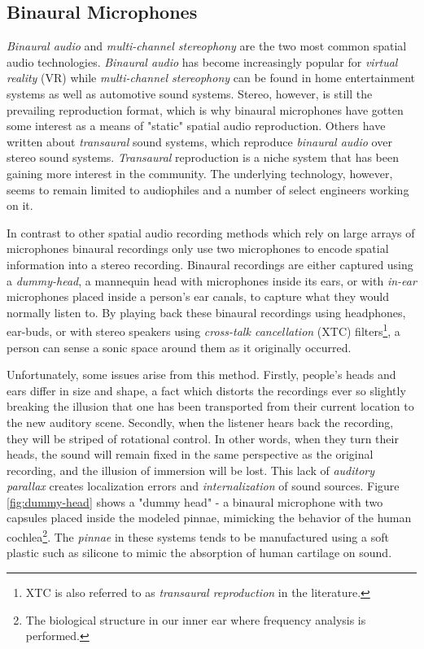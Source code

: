\subsection{Binaural Microphones}

\textit{Binaural audio} and \textit{multi-channel stereophony} are the two most common spatial audio technologies. \textit{Binaural audio} has become increasingly popular for \textit{virtual reality} (VR) while \textit{multi-channel stereophony} can be found in home entertainment systems as well as automotive sound systems. Stereo, however, is still the prevailing reproduction format, which is why binaural microphones have gotten some interest as a means of "static" spatial audio reproduction. Others have written about \textit{transaural} sound systems, which reproduce \textit{binaural audio} over stereo sound systems. \textit{Transaural} reproduction is a niche system that has been gaining more interest in the community. The underlying technology, however, seems to remain limited to audiophiles and a number of select engineers working on it.

In contrast to other spatial audio recording methods which rely on large arrays of microphones binaural recordings only use two microphones to encode spatial information into a stereo recording. Binaural recordings are either captured using a \textit{dummy-head}, a mannequin head with microphones inside its ears, or with \textit{in-ear} microphones placed inside a person's ear canals, to capture what they would normally listen to. By playing back these binaural recordings using headphones, ear-buds, or with stereo speakers using \textit{cross-talk cancellation} (XTC) filters\footnote{XTC is also referred to as \textit{transaural reproduction} in the literature.}, a person can sense a sonic space around them as it originally occurred. 

Unfortunately, some issues arise from this method. Firstly, people's heads and ears differ in size and shape, a fact which distorts the recordings ever so slightly breaking the illusion that one has been transported from their current location to the new auditory scene. Secondly, when the listener hears back the recording, they will be striped of rotational control. In other words, when they turn their heads, the sound will remain fixed in the same perspective as the original recording, and the illusion of immersion will be lost. This lack of \textit{auditory parallax} creates localization errors and \textit{internalization} of sound sources. Figure \ref{fig:dummy-head} shows a "dummy head" - a binaural microphone with two capsules placed inside the modeled pinnae, mimicking the behavior of the human cochlea\footnote{The biological structure in our inner ear where frequency analysis is performed.}. The \textit{pinnae} in these systems tends to be manufactured using a soft plastic such as silicone to mimic the absorption of human cartilage on sound.

